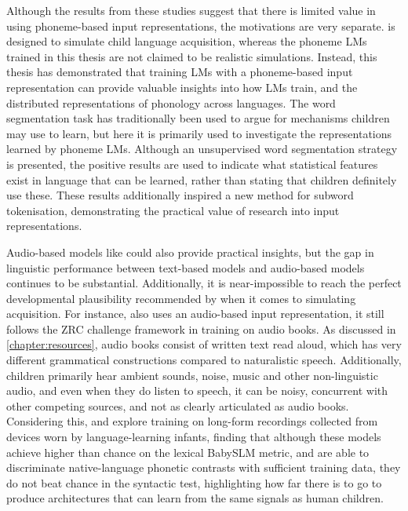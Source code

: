 Although the results from these studies suggest that there is limited value in using phoneme-based input representations, the motivations are very separate. \stela is designed to simulate child language acquisition, whereas the phoneme LMs trained in this thesis are not claimed to be realistic simulations. Instead, this thesis has demonstrated that training LMs with a phoneme-based input representation can provide valuable insights into how LMs train, and the distributed representations of phonology across languages. The word segmentation task has traditionally been used to argue for mechanisms children may use to learn, but here it is primarily used to investigate the representations learned by phoneme LMs. Although an unsupervised word segmentation strategy is presented, the positive results are used to indicate what statistical features exist in language that can be learned, rather than stating that children definitely use these. These results additionally inspired a new method for subword tokenisation, demonstrating the practical value of research into input representations.

Audio-based models like \stela could also provide practical insights, but the gap in linguistic performance between text-based models and audio-based models continues to be substantial. Additionally, it is near-impossible to reach the perfect developmental plausibility recommended by \citet{dupoux-2018-cognitive} when it comes to simulating acquisition. For instance, also \stela uses an audio-based input representation, it still follows the ZRC challenge framework in training on audio books. As discussed in \cref{chapter:resources}, audio books consist of written text read aloud, which has very different grammatical constructions compared to naturalistic speech. Additionally, children primarily hear ambient sounds, noise, music and other non-linguistic audio, and even when they do listen to speech, it can be noisy, concurrent with other competing sources, and not as clearly articulated as audio books. Considering this, \citet{lavechin} and \citet{lavechin2024modeling} explore training \stela on long-form recordings collected from devices worn by language-learning infants, finding that although these models achieve higher than chance on the lexical BabySLM metric, and are able to discriminate native-language phonetic contrasts with sufficient training data, they do not beat chance in the syntactic test, highlighting how far there is to go to produce architectures that can learn from the same signals as human children.


